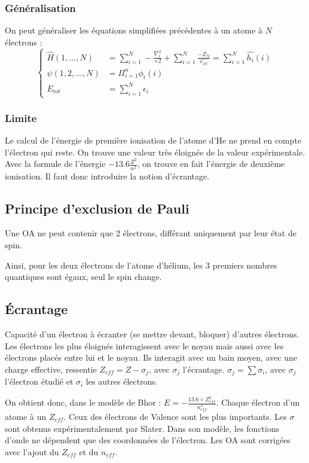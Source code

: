 \documentclass[french]{yLectureNote}
\newcommand{\HH}{\hat{H}}
\newcommand{\lap}{\nabla^2}
\begin{document}
\subsubsection{Généralisation}
On peut généraliser les équations simplifiées précédentes à un atome à \(N\) électrons :
\[ \left\{\begin{matrix}
  \HH(1,\dots, N) &= \sum_{i=1}^N -\frac{\lap_i}{×2}+\sum_{i=1}^N\frac{-Z_N}{\hat{r_{iN}}} = \sum_{i=1}^N\hat{h_i}(i)\\
  \psi(1,2,\dots, N) &= \Pi^n_{i=1}\phi_i(i)\\
  E_{tot} &= \sum_{i=1}^N\epsilon_i
\end{matrix}\right.\]
\subsubsection{Limite}
Le calcul de l'énergie de première ionisation de l'atome d'He ne prend en compte l'électron qui reste. On trouve une valeur très éloignée de la valeur expérimentale. Avec la formule de l'énergie \(-13.6\frac{Z^2}{n^2}\), on trouve en fait l'énergie de deuxième ionisation. Il faut donc introduire la notion d'écrantage.
\subsection{Principe d'exclusion de Pauli}
\begin{theorem}
 Une OA ne peut contenir que 2 électrons, différant uniquement par leur état de spin.
\end{theorem}
Ainsi, pour les deux électrons de l'atome d'hélium, les 3 premiers nombres quantiques sont égaux, seul le spin change.
\subsection{Écrantage}
\begin{theorem}[Écrantage]
Capacité d'un électron à écranter (se mettre devant, bloquer) d'autres électrons. Les électrons les plus éloignés interagissent avec le noyau mais aussi avec les électrons placés entre lui et le noyau. Ils interagit avec un bain moyen, avec une charge effective, ressentie $Z_{eff} = Z-\sigma_j$, avec $\sigma_j$ l'écrantage.
$\sigma_j = \sum \sigma_i$, avec $\sigma_j$ l'électron étudié et $\sigma_i$ les autres électrons.
\end{theorem}
On obtient donc, dans le modèle de Bhor : $E = -\frac{13.6\times Z_{eff}^2}{n_{eff}^2}$.
Chaque électron d'un atome à un $Z_{eff}$. Ceux des électrons de Valence sont les plus importants.
Les \(\sigma\) sont obtenus expérimentalement par Slater. Dans son modèle, les fonctions d'onde ne dépendent que des coordonnées de l'électron. Les OA sont corrigées avec l'ajout du \(Z_{eff}\) et du \(n_{eff}\).
\end{document}
